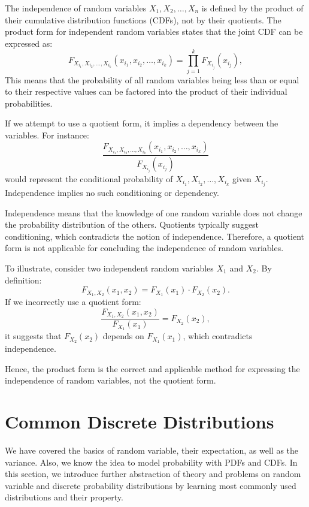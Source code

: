 \begin{solution}
    The independence of random variables \( X_1, X_2, \ldots, X_n \) is defined by the product of their cumulative distribution functions (CDFs), not by their quotients. The product form for independent random variables states that the joint CDF can be expressed as:
    \[
    F_{X_{i_1}, X_{i_2}, \ldots, X_{i_k}}(x_{i_1}, x_{i_2}, \ldots, x_{i_k}) = \prod_{j=1}^k F_{X_{i_j}}(x_{i_j}),
    \]
    This means that the probability of all random variables being less than or equal to their respective values can be factored into the product of their individual probabilities.

    If we attempt to use a quotient form, it implies a dependency between the variables. For instance:
    \[
    \frac{F_{X_{i_1}, X_{i_2}, \ldots, X_{i_k}}(x_{i_1}, x_{i_2}, \ldots, x_{i_k})}{F_{X_{i_j}}(x_{i_j})}
    \]
    would represent the conditional probability of \( X_{i_1}, X_{i_2}, \ldots, X_{i_k} \) given \( X_{i_j} \). Independence implies no such conditioning or dependency.

    Independence means that the knowledge of one random variable does not change the probability distribution of the others. Quotients typically suggest conditioning, which contradicts the notion of independence. Therefore, a quotient form is not applicable for concluding the independence of random variables.

    To illustrate, consider two independent random variables \( X_1 \) and \( X_2 \). By definition:
    \[
    F_{X_1, X_2}(x_1, x_2) = F_{X_1}(x_1) \cdot F_{X_2}(x_2).
    \]
    If we incorrectly use a quotient form:
    \[
    \frac{F_{X_1, X_2}(x_1, x_2)}{F_{X_1}(x_1)} = F_{X_2}(x_2),
    \]
    it suggests that \( F_{X_2}(x_2) \) depends on \( F_{X_1}(x_1) \), which contradicts independence.

    Hence, the product form is the correct and applicable method for expressing the independence of random variables, not the quotient form.
\end{solution}

\section{Common Discrete Distributions}
We have covered the basics of random variable, their expectation, as well as the variance. Also, we know the idea to model probability with PDFs and CDFs. In this section, we introduce further abstraction of theory and problems on random variable and discrete probability distributions by learning most commonly used distributions and their property.
